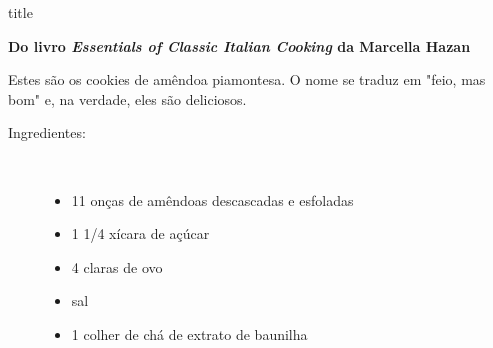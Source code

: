 \documentclass [11pt, letterpaper] {article}
\begin{document}
 {title}

\begin {flushright}
{\bf Do livro {\it Essentials of Classic Italian Cooking} da Marcella Hazan}
\end {flushright}

Estes são os cookies de amêndoa piamontesa. O nome se traduz em "feio, mas bom" e, na verdade, eles são deliciosos.

\begin {description}

\item [Ingredientes:] \ \\
\begin {itemize}
\item 11 onças de amêndoas descascadas e esfoladas
\item 1 1/4 xícara de açúcar
\item 4 claras de ovo
\item sal
\item 1 colher de chá de extrato de baunilha
\end {itemize}


\end{description}
\end{document}
